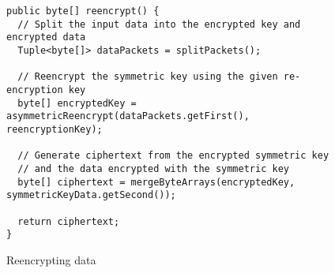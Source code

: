\begin{figure}[H]
  \centering
  \begin{verbatim}
public byte[] reencrypt() {
  // Split the input data into the encrypted key and encrypted data
  Tuple<byte[]> dataPackets = splitPackets();

  // Reencrypt the symmetric key using the given re-encryption key
  byte[] encryptedKey = asymmetricReencrypt(dataPackets.getFirst(), reencryptionKey);

  // Generate ciphertext from the encrypted symmetric key
  // and the data encrypted with the symmetric key
  byte[] ciphertext = mergeByteArrays(encryptedKey, symmetricKeyData.getSecond());

  return ciphertext;
}
  \end{verbatim}
  \caption{Reencrypting data}
  \label{code:reencrypt_data}
\end{figure}
